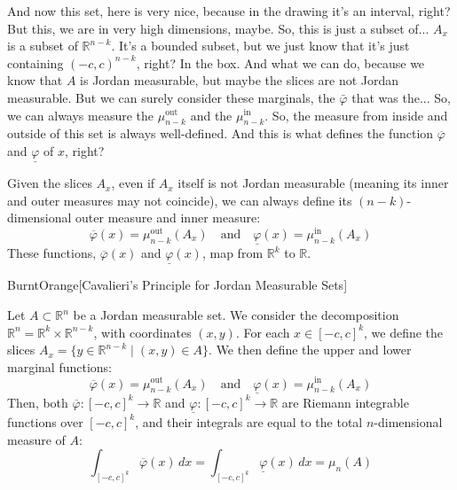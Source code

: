 \begin{spoken-clean}[00:01:47 - 00:02:20]
And now this set, here is very nice, because in the drawing it's an interval, right? But this, we are in very high dimensions, maybe. So, this is just a subset of... $A_x$ is a subset of $\mathbb{R}^{n-k}$. It's a bounded subset, but we just know that it's just containing $(-c,c)^{n-k}$, right? In the box. And what we can do, because we know that $A$ is Jordan measurable, but maybe the slices are not Jordan measurable. But we can surely consider these marginals, the $\bar{\varphi}$ that was the... So, we can always measure the $\mu_{n-k}^{\text{out}}$ and the $\mu_{n-k}^{\text{in}}$. So, the measure from inside and outside of this set is always well-defined. And this is what defines the function $\overline{\varphi}$ and $\underline{\varphi}$ of $x$, right?
\end{spoken-clean}

\begin{math-stroke}
Given the slices $A_x$, even if $A_x$ itself is not Jordan measurable (meaning its inner and outer measures may not coincide), we can always define its $(n-k)$-dimensional outer measure and inner measure:
\[
\overline{\varphi}(x) = \mu_{n-k}^{\text{out}}(A_x) \quad \text{and} \quad \underline{\varphi}(x) = \mu_{n-k}^{\text{in}}(A_x)
\]
These functions, $\overline{\varphi}(x)$ and $\underline{\varphi}(x)$, map from $\mathbb{R}^k$ to $\mathbb{R}$.
\end{math-stroke}

\begin{color-box}{BurntOrange}[Cavalieri's Principle for Jordan Measurable Sets]
\begin{theorem}
\label{thm:cavalieri-jordan-sets}
Let $A \subset \mathbb{R}^n$ be a Jordan measurable set. We consider the decomposition $\mathbb{R}^n = \mathbb{R}^k \times \mathbb{R}^{n-k}$, with coordinates $(x,y)$. For each $x \in [-c,c]^k$, we define the slices $A_x = \{y \in \mathbb{R}^{n-k} \mid (x,y) \in A \}$. We then define the upper and lower marginal functions:
\[
\overline{\varphi}(x) = \mu_{n-k}^{\text{out}}(A_x) \quad \text{and} \quad \underline{\varphi}(x) = \mu_{n-k}^{\text{in}}(A_x)
\]
Then, both $\overline{\varphi}: [-c,c]^k \to \mathbb{R}$ and $\underline{\varphi}: [-c,c]^k \to \mathbb{R}$ are Riemann integrable functions over $[-c,c]^k$, and their integrals are equal to the total $n$-dimensional measure of $A$:
\[
\int_{[-c,c]^k} \overline{\varphi}(x) \, dx = \int_{[-c,c]^k} \underline{\varphi}(x) \, dx = \mu_n(A)
\]
\end{theorem}
\end{color-box}

